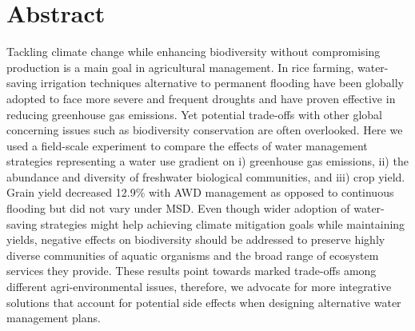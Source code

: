 \section*{Abstract}
Tackling climate change while enhancing biodiversity without compromising production is a main goal in agricultural management. In rice farming, water-saving irrigation techniques alternative to permanent flooding have been globally adopted to face more severe and frequent droughts and have proven effective in reducing greenhouse gas emissions. Yet potential trade-offs with other global concerning issues such as biodiversity conservation are often overlooked. Here we used a field-scale experiment to compare the effects of water management strategies representing a water use gradient  on i) greenhouse gas emissions, ii) the abundance and diversity of freshwater biological communities, and iii) crop yield.   Grain yield decreased 12.9\% with AWD management as opposed to continuous flooding but did not vary under MSD. Even though wider adoption of water-saving strategies might help achieving climate mitigation goals while maintaining yields, negative effects on biodiversity should be addressed to preserve highly diverse communities of aquatic organisms and the broad range of ecosystem services they provide. These results point towards marked trade-offs among different agri-environmental issues, therefore, we advocate for more integrative solutions that account for potential side effects when designing alternative water management plans.\\

